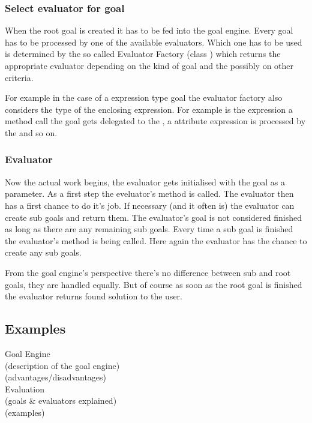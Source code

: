 \documentclass[12pt,halfparskip]{scrreprt}
\begin{document}
\subsubsection{Select evaluator for goal}
When the root goal is created it has to be fed into the goal engine. Every goal has to be processed by one of the available evaluators. Which one has to be used is determined by the so called Evaluator Factory (class ) which returns the appropriate evaluator depending on the kind of goal and the possibly on other criteria. 

For example in the case of a expression type goal the evaluator factory also considers the type of the enclosing expression. For example is the expression a method call the goal gets delegated to the , a attribute expression is processed by the  and so on.


\subsubsection{Evaluator}
Now the actual work begins, the evaluator gets initialised with the goal as a parameter. As a first step the eveluator's  method is called. The evaluator then has a first chance to do it's job. If necessary (and it often is) the evaluator can create sub goals and return them. The evaluator's goal is not considered finished as long as there are any remaining sub goals. Every time a sub goal is finished the evaluator's  method is being called. Here again the evaluator has the chance to create any sub goals. 

From the goal engine's perspective there's no difference between sub and root goals, they are handled equally. But of course as soon as the root goal is finished the evaluator returns found solution to the user.



\subsection{Examples}


Goal Engine \\
 (description of the goal engine)\\
 (advantages/disadvantages)\\
Evaluation\\
 (goals \& evaluators explained)\\
 (examples)
\end{document}
